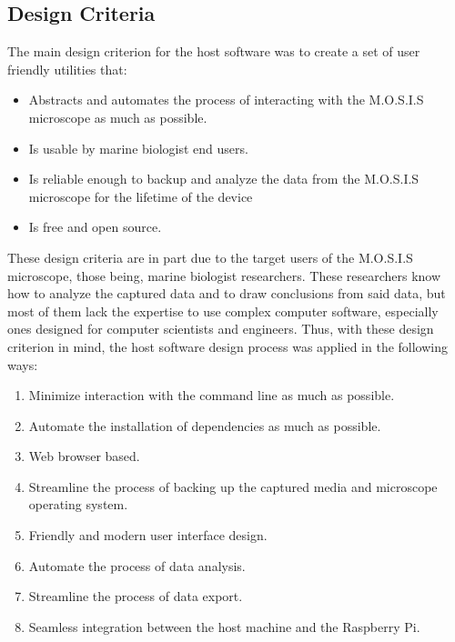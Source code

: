 \documentclass[12pt]{article}
\begin{document}
\subsection{Design Criteria}
The main design criterion for the host software was to create a set of user friendly utilities that:
\begin{itemize}
	\item Abstracts and automates the process of interacting with the M.O.S.I.S microscope as much as possible.
	\item Is usable by marine biologist end users.
	\item Is reliable enough to backup and analyze the data from the M.O.S.I.S microscope for the lifetime of the device
	\item Is free and open source.
\end{itemize}
These design criteria are in part due to the target users of the M.O.S.I.S microscope, those being, marine biologist researchers. These researchers know how to analyze the captured data and to draw conclusions from said data, but most of them lack the expertise to use complex computer software, especially ones designed for computer scientists and engineers. Thus, with these design criterion in mind, the host software design process was applied in the following ways:
\begin{enumerate}
	\item Minimize interaction with the command line as much as possible.
	\item Automate the installation of dependencies as much as possible.
	\item Web browser based.
	\item Streamline the process of backing up the captured media and microscope operating system.
	\item Friendly and modern user interface design.
	\item Automate the process of data analysis.
	\item Streamline the process of data export.
	\item Seamless integration between the host machine and the Raspberry Pi.
\end{enumerate}
\end{document}
